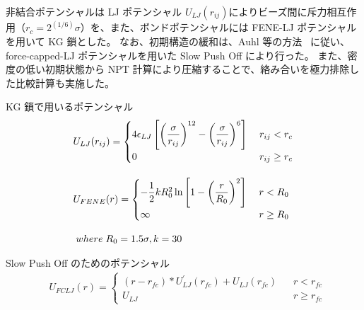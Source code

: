 \documentclass[uplatex,dvipdfmx,a4paper,11pt]{jsarticle}
\begin{document}
非結合ポテンシャルは LJ ポテンシャル $U_{LJ}(r_{ij})$によりビーズ間に斥力相互作用（$r_c = 2^{(1/6)}\sigma$）を、また、ボンドポテンシャルには FENE-LJ ポテンシャルを用いて KG 鎖とした。
なお、初期構造の緩和は、Auhl 等の方法~\cite{Auhl2003a} に従い、force-capped-LJ ポテンシャルを用いた Slow Push Off により行った。
また、密度の低い初期状態から NPT 計算により圧縮することで、絡み合いを極力排除した比較計算も実施した。
    \begin{center}
        \begin{minipage}{0.46\textwidth}
            \begin{itembox}[l]{KG 鎖で用いるポテンシャル}
                \scriptsize
                \begin{align*}
                    &U_{LJ}( r_{ij} ) =
                    \begin{cases}
                    4\epsilon_{LJ} \left[ \left( \dfrac{ \sigma }{ r_{ij} } \right)^{12} - \left( \dfrac{ \sigma }{ r_{ij} } \right)^{6} \right] \; & r_{ij}< r_c \\[8pt]
                    0 \; & r_{ij} \geq r_c
                    \end{cases} \\[10pt]
                    &U_{FENE}( r ) = 
                    \begin{cases}
                    -\dfrac{1}{2} k R_0^2 \ln \left[ 1 - \left( \dfrac{ r }{ R_0 } \right)^{2} \right]  \; & r < R_0 \\[8pt]
                    \infty \; & r \geq R_0
                    \end{cases} \\[8pt]
                    &\; where \; R_0 = 1.5 \sigma, k = 30 \notag
                    \end{align*}
            \end{itembox}
        \end{minipage}
        \begin{minipage}{0.5\textwidth}
            \begin{itembox}[l]{Slow Push Off のためのポテンシャル}
                \scriptsize
                \begin{align*}
                    &U_{FCLJ}(r) = 
                    \begin{cases}
                    (r-r_{fc})*U_{LJ}^{\prime}(r_{fc}) + U_{LJ}(r_{fc}) \;\;\; &r< r_{fc} \\[8pt]
                    U_{LJ}   \;\;\;\;\;\;\;\;\; &r \geq r_{fc}

\end{cases}
\end{align*}
\end{itembox}
\end{minipage}
\end{center}
\end{document}
